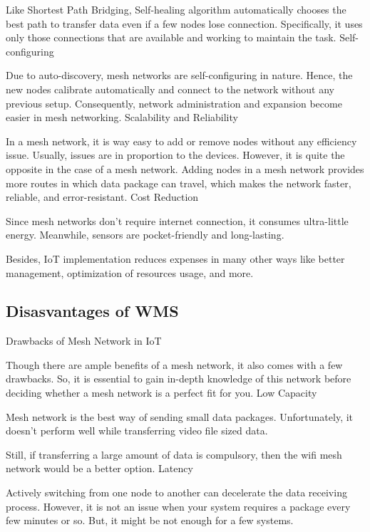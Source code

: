 			Like Shortest Path Bridging, Self-healing algorithm automatically chooses the best path to transfer data even if a few nodes lose connection. Specifically, it uses only those connections that are available and working to maintain the task.
			Self-configuring
			
			Due to auto-discovery, mesh networks are self-configuring in nature. Hence, the new nodes calibrate automatically and connect to the network without any previous setup. Consequently, network administration and expansion become easier in mesh networking.
			Scalability and Reliability
			
			In a mesh network, it is way easy to add or remove nodes without any efficiency issue. Usually, issues are in proportion to the devices. However, it is quite the opposite in the case of a mesh network. Adding nodes in a mesh network provides more routes in which data package can travel, which makes the network faster, reliable, and error-resistant.
			Cost Reduction
			
			Since mesh networks don’t require internet connection, it consumes ultra-little energy. Meanwhile, sensors are pocket-friendly and long-lasting.
			
			Besides, IoT implementation reduces expenses in many other ways like better management, optimization of resources usage, and more.
		
		\subsection{Disasvantages of WMS}
		
			Drawbacks of Mesh Network in IoT
			
			Though there are ample benefits of a mesh network, it also comes with a few drawbacks. So, it is essential to gain in-depth knowledge of this network before deciding whether a mesh network is a perfect fit for you.
			Low Capacity
			
			Mesh network is the best way of sending small data packages. Unfortunately, it doesn’t perform well while transferring video file sized data.
			
			Still, if transferring a large amount of data is compulsory, then the wifi mesh network would be a better option.
			Latency
			
			Actively switching from one node to another can decelerate the data receiving process. However, it is not an issue when your system requires a package every few minutes or so. But, it might be not enough for a few systems.
			
